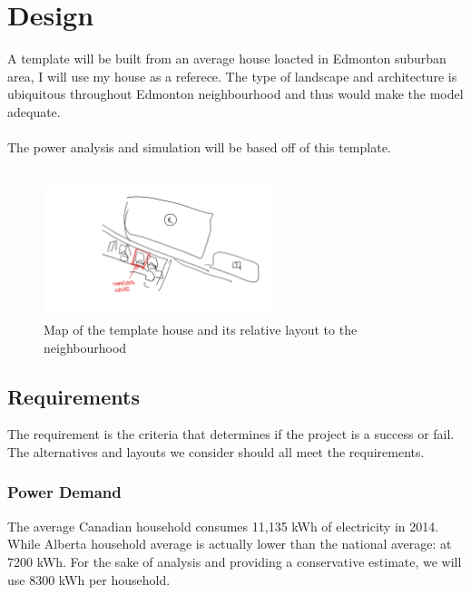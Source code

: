 \documentclass[10pt,letterpaper]{article}
\begin{document}
\section{Design}

A template will be built from an average house loacted in Edmonton suburban area, I will use my house as a referece. The type of landscape and architecture is ubiquitous throughout Edmonton neighbourhood and thus would make the model adequate.\\
\\
The power analysis and simulation will be based off of this template.\\
\\

\begin{figure}[H]
	\centering
	\includegraphics[width=0.6\textwidth]{assets/template-house-map}
	\caption{Map of the template house and its relative layout to the neighbourhood}
	\label{fig:template-house-path}
\end{figure}

\subsection{Requirements}\label{requriements}

The requirement is the criteria that determines if the project is a success or fail. The alternatives and layouts we consider should all meet the requirements.\\

\subsubsection{Power Demand}

The average Canadian household consumes 11,135 kWh of electricity in 2014\cite{residential-energy-use}. While Alberta household average is actually lower than the national average: at 7200 kWh. For the sake of analysis and providing a conservative estimate, we will use 8300 kWh per household.\cite{aeso-load-data, ieso-power-data, callmepower}\\
\end{document}
